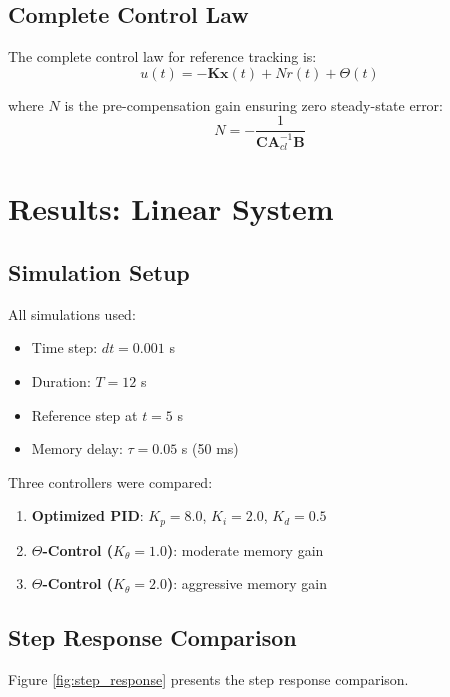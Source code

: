 \documentclass[12pt,a4paper]{article}
\begin{document}
\subsection{Complete Control Law}

The complete control law for reference tracking is:
\begin{equation}
u(t) = -\mathbf{K}\mathbf{x}(t) + N r(t) + \Theta(t)
\label{eq:complete_law}
\end{equation}

where $N$ is the pre-compensation gain ensuring zero steady-state 
error:
\begin{equation}
N = -\frac{1}{\mathbf{C}\mathbf{A}_{cl}^{-1}\mathbf{B}}
\label{eq:n_gain}
\end{equation}

\section{Results: Linear System}

\subsection{Simulation Setup}

All simulations used:
\begin{itemize}
    \item Time step: $dt = 0.001$ s
    \item Duration: $T = 12$ s
    \item Reference step at $t = 5$ s
    \item Memory delay: $\tau = 0.05$ s (50 ms)
\end{itemize}

Three controllers were compared:
\begin{enumerate}
    \item \textbf{Optimized PID}: $K_p=8.0$, $K_i=2.0$, $K_d=0.5$
    \item \textbf{$\Theta$-Control ($K_\theta =1.0$)}: moderate memory gain
    \item \textbf{$\Theta$-Control ($K_\theta =2.0$)}: aggressive memory gain
\end{enumerate}

\subsection{Step Response Comparison}

Figure \ref{fig:step_response} presents the step response comparison.
\end{document}
